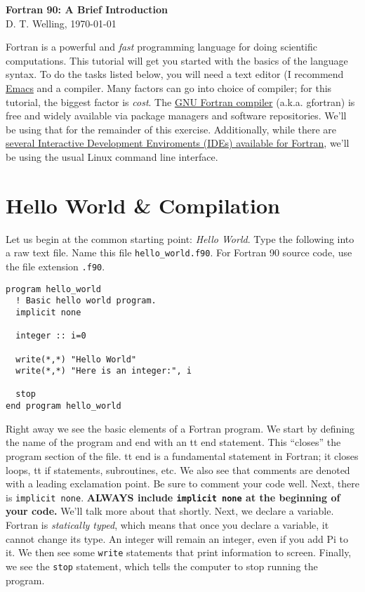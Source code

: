 \documentclass[11pt, letterpaper]{article}
\begin{document}
\setlength{\pdfpageheight}{\paperheight}
\setlength{\pdfpagewidth}{\paperwidth}

\begin{center}
  {\LARGE \textbf{Fortran 90: A Brief Introduction}\\}
  {\large D. T. Welling, \today}
\end{center}

Fortran is a powerful and \emph{fast} programming language for doing
scientific computations.  This tutorial will get you started with the basics
of the language syntax.  To do the tasks listed below, you will need a
text editor (I recommend \href{https://www.gnu.org/software/emacs/}{Emacs}
and a compiler.  Many factors can go into choice of compiler; for this
tutorial, the biggest factor is \emph{cost}.  The
\href{https://gcc.gnu.org/fortran/}{GNU Fortran compiler} (a.k.a. gfortran)
is free and widely available via package managers and software repositories.
We'll be using that for the remainder of this exercise.  Additionally,
while there are \href{https://www.google.com/webhp?sourceid=chrome-instant&ion=1&espv=2&es_th=1&ie=UTF-8#q=fortran%20ide}
  {several Interactive Development Enviroments (IDEs) available
    for Fortran}, we'll be using the usual Linux command line interface.

\section{Hello World \& Compilation}

Let us begin at the common starting point: \emph{Hello World}.  Type the
following into a raw text file.  Name this file {\tt hello\_world.f90}.
For Fortran 90 source code, use the file extension {\tt .f90}.

\begin{verbatim}
program hello_world
  ! Basic hello world program.
  implicit none
  
  integer :: i=0
  
  write(*,*) "Hello World"
  write(*,*) "Here is an integer:", i

  stop
end program hello_world
\end{verbatim}

Right away we see the basic elements of a Fortran program.  We start by
defining the name of the program and end with an {tt end} statement.  This
``closes'' the program section of the file.  {tt end} is a fundamental
statement in Fortran; it closes loops, {tt if} statements, subroutines, etc.
We also see that comments are denoted with a leading exclamation point.
Be sure to comment your code well.  Next, there is {\tt implicit none}.
\textbf{ALWAYS include {\tt implicit none} at the beginning of your code.}
We'll talk more about that shortly.  Next, we declare a variable.  Fortran
is \emph{statically typed}, which means that once you declare a variable, it
cannot change its type.  An integer will remain an integer, even if you add
Pi to it.  We then see some {\tt write} statements that print information
to screen.  Finally, we see the {\tt stop} statement, which tells the
computer to stop running the program.
\end{document}
